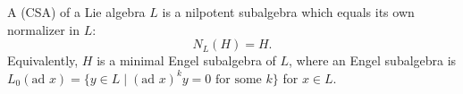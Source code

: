 A  (CSA) of a Lie algebra $L$ is a nilpotent subalgebra which equals its own normalizer in $L$:
$$N_L(H) = H.$$
Equivalently, $H$ is a minimal Engel subalgebra of $L$, where an Engel subalgebra is $L_0(\text{ad } x) = \{y \in L \mid (\text{ad } x)^k y = 0 \text{ for some } k\}$ for $x \in L$.
